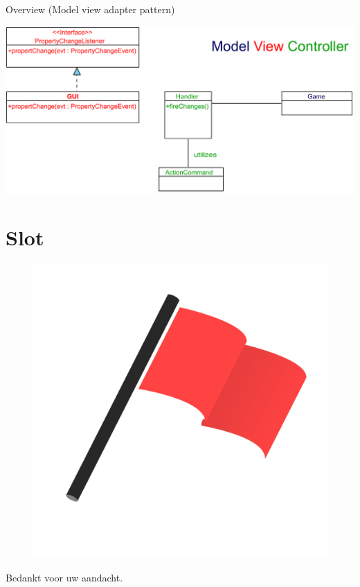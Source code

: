 \documentclass[11pt,t]{beamer}
\begin{document}
\begin{frame}{Overview (Model view adapter pattern)}
\begin{center}
\includegraphics[width=0.9\linewidth]{images/mvc}
\end{center}
\end{frame}
\section{Slot}
\begin{frame}
\vspace{0.5in}
\begin{center}
\begin{figure}
\includegraphics[scale=0.3]{images/flagicon}
\end{figure}

Bedankt voor uw aandacht.
\end{center}
\end{frame}
\end{document}
